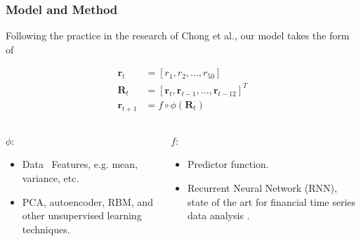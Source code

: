 \documentclass{beamer}
\begin{document}
\begin{frame}
\frametitle{Model and Method}
Following the practice in the research of Chong et al.\cite{Chong2017}, our model takes the form of

\begin{align*}
\mathbf{r}_{t} & =[r_1,r_2,...,r_{50}] \\
\mathbf{R}_t & = [\mathbf{r}_t,\mathbf{r}_{t-1},...,\mathbf{r}_{t-12}]^T \\
\mathbf{r}_{t+1} & =f\circ\phi(\mathbf{R}_t)
\end{align*}

\begin{columns}
\begin{column}{0.5\textwidth}
\setlength{\partopsep}{0pt}
$\phi$:
\begin{itemize}
	\item Data \textrightarrow\, Features, e.g. mean, variance, etc.
	\item PCA, autoencoder, RBM, and other unsupervised learning techniques.
\end{itemize}
\end{column}
\begin{column}{0.5\textwidth}
\setlength{\partopsep}{0pt}
$f$:
\begin{itemize}
	\item Predictor function.
	\item Recurrent Neural Network (RNN), state of the art for financial time series data analysis \cite{Abe2018}.
\end{itemize}
\end{column}
\end{columns}

\end{frame}
\end{document}

